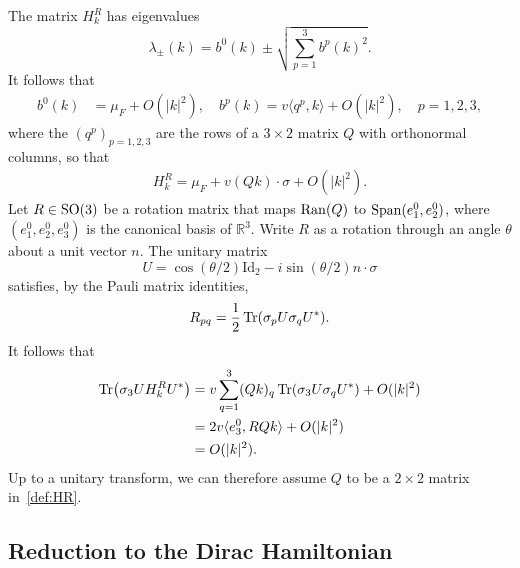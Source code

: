\documentclass[a4paper,11pt]{article}
\theoremstyle{plain}
\theoremstyle{remark}
\def\R{{\mathbb R}}
\begin{document}
The matrix $H_k^{R}$ has eigenvalues
$$  \lambda_{\pm}(k) = b^{0}(k) \pm \sqrt{\sum_{p=1}^{3}b^{p}(k)^{2}}.
$$
It follows that
\begin{align*}
  b^{0}(k) &= \mu_{F} + O(|k|^{2}), \quad
  b^{p}(k) = v\langle q^{p}, k\rangle + O(|k|^{2}), \quad p=1,2,3,
\end{align*}
where the $(q^{p})_{p=1,2,3}$ are the rows of a $3 \times 2$
matrix $Q$ with orthonormal columns, so that
\begin{align}\label{def:HR}
  H_k^{R} = \mu_{F} + v (Q k) \cdot \sigma + O(|k|^{2}).
\end{align}
Let $R \in {\rm SO}(3)$ be a rotation matrix that maps
${\rm Ran}(Q)$ to ${\rm Span}(e^0_{1},e^0_{2})$, where $(e^0_{1},e^0_{2},e^0_{3})$ is the canonical basis of $\R^3$. Write $R$ as a rotation through an angle $\theta$ about a unit vector $n$.
The unitary matrix
\[
U=\cos(\theta/2)\mathrm{Id}_2-i\sin(\theta/2)n\cdot\sigma
\]
satisfies, by the Pauli matrix identities,
\begin{align*}
  R_{pq} = \frac 1 2 \Tr(\sigma_{p} U \sigma_{q} U^{*}).
\end{align*}
It follows that
\begin{align*}
  \Tr(\sigma_{3} U H_k^{R} U^{*}) &= v\sum_{q=1}^{3} (Q k)_{q} \Tr(\sigma_{3} U \sigma_{q} U^{*}) + O(|k|^{2})\\
  &= 2 v\langle e^0_3,RQk\rangle+O(|k|^2)\\
  &= O(|k|^{2}).
\end{align*}
Up to a unitary transform, we can therefore assume $Q$ to be
a $2\times 2$ matrix in~\eqref{def:HR}.

\subsection{Reduction to the Dirac Hamiltonian}
\end{document}
